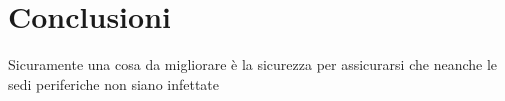 \chapter{Conclusioni}

Sicuramente una cosa da migliorare è la sicurezza per assicurarsi che neanche le sedi periferiche non siano infettate
